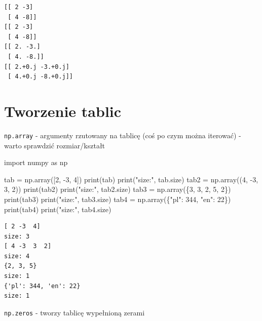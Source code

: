 \documentclass[
  polish,
  letterpaper,
  DIV=11,
  numbers=noendperiod]{scrreprt}
\newenvironment{Shaded}{\begin{snugshade}}{\end{snugshade}}
\newcommand{\BuiltInTok}[1]{\textcolor[rgb]{0.00,0.23,0.31}{#1}}
\newcommand{\DecValTok}[1]{\textcolor[rgb]{0.68,0.00,0.00}{#1}}
\newcommand{\ImportTok}[1]{\textcolor[rgb]{0.00,0.46,0.62}{#1}}
\newcommand{\NormalTok}[1]{\textcolor[rgb]{0.00,0.23,0.31}{#1}}
\newcommand{\OperatorTok}[1]{\textcolor[rgb]{0.37,0.37,0.37}{#1}}
\newcommand{\StringTok}[1]{\textcolor[rgb]{0.13,0.47,0.30}{#1}}
\begin{document}
\begin{verbatim}
[[ 2 -3]
 [ 4 -8]]
[[ 2 -3]
 [ 4 -8]]
[[ 2. -3.]
 [ 4. -8.]]
[[ 2.+0.j -3.+0.j]
 [ 4.+0.j -8.+0.j]]
\end{verbatim}

\chapter{Tworzenie tablic}\label{tworzenie-tablic}

\texttt{np.array} - argumenty rzutowany na tablicę (coś po czym można
iterować) - warto sprawdzić rozmiar/kształt

\begin{Shaded}
\begin{Highlighting}[]
\ImportTok{import}\NormalTok{ numpy }\ImportTok{as}\NormalTok{ np}

\NormalTok{tab }\OperatorTok{=}\NormalTok{ np.array([}\DecValTok{2}\NormalTok{, }\OperatorTok{{-}}\DecValTok{3}\NormalTok{, }\DecValTok{4}\NormalTok{])}
\BuiltInTok{print}\NormalTok{(tab)}
\BuiltInTok{print}\NormalTok{(}\StringTok{"size:"}\NormalTok{, tab.size)}
\NormalTok{tab2 }\OperatorTok{=}\NormalTok{ np.array((}\DecValTok{4}\NormalTok{, }\OperatorTok{{-}}\DecValTok{3}\NormalTok{, }\DecValTok{3}\NormalTok{, }\DecValTok{2}\NormalTok{))}
\BuiltInTok{print}\NormalTok{(tab2)}
\BuiltInTok{print}\NormalTok{(}\StringTok{"size:"}\NormalTok{, tab2.size)}
\NormalTok{tab3 }\OperatorTok{=}\NormalTok{ np.array(\{}\DecValTok{3}\NormalTok{, }\DecValTok{3}\NormalTok{, }\DecValTok{2}\NormalTok{, }\DecValTok{5}\NormalTok{, }\DecValTok{2}\NormalTok{\})}
\BuiltInTok{print}\NormalTok{(tab3)}
\BuiltInTok{print}\NormalTok{(}\StringTok{"size:"}\NormalTok{, tab3.size)}
\NormalTok{tab4 }\OperatorTok{=}\NormalTok{ np.array(\{}\StringTok{"pl"}\NormalTok{: }\DecValTok{344}\NormalTok{, }\StringTok{"en"}\NormalTok{: }\DecValTok{22}\NormalTok{\})}
\BuiltInTok{print}\NormalTok{(tab4)}
\BuiltInTok{print}\NormalTok{(}\StringTok{"size:"}\NormalTok{, tab4.size)}
\end{Highlighting}
\end{Shaded}

\begin{verbatim}
[ 2 -3  4]
size: 3
[ 4 -3  3  2]
size: 4
{2, 3, 5}
size: 1
{'pl': 344, 'en': 22}
size: 1
\end{verbatim}

\texttt{np.zeros} - tworzy tablicę wypełnioną zerami
\end{document}
